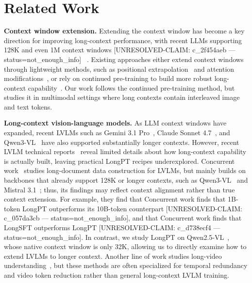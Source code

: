 \documentclass{llmxive}
\begin{document}
\section{Related Work}
\label{sec:related}
\noindent\textbf{Context window extension.}
Extending the context window has become a key direction for improving long-context performance, with recent LLMs supporting 128K and even 1M context windows [UNRESOLVED-CLAIM: c_2f454aeb — status=not_enough_info] ~\citep{yang2025qwen3,hurst2024gpt,team2024gemini_1_5,google2024gemini_2,google2025gemini2_5}.
Existing approaches either extend context windows through lightweight methods, such as positional extrapolation~\citep{chen2023extending,pengyarn,ding2024longrope,zhang2024extending,zhu2023pose} and attention modifications~\citep{chen2023longlora,xiao2023efficient,xiao2024infllm,bertsch2023unlimiformer,jin2024llm}, or rely on continued pre-training to build more robust long-context capability~\citep{xiong2024effective,fu2024data,gao2025prolong,Yang2025Qwen251MTR}.
Our work follows the continued pre-training method, but studies it in multimodal settings where long contexts contain interleaved image and text tokens.

\noindent\textbf{Long-context vision-language models.}
As LLM context windows have expanded, recent LVLMs such as Gemini 3.1 Pro~\citep{gemini_3_1_pro_2026}, Claude Sonnet 4.7~\citep{anthropic2026introducing_claude_opus_4_7}, and Qwen3-VL~\citep{bai2025qwen3} have also supported substantially longer contexts.
However, recent LVLM technical reports~\citep{bai2025qwen3,hong2025glm} reveal limited details about how long-context capability is actually built, leaving practical LongPT recipes underexplored.
Concurrent work~\citep{veselka2026longvlm} studies long-document data construction for LVLMs, but mainly builds on backbones that already support 128K or longer contexts, such as Qwen3-VL~\citep{bai2025qwen3} and Mistral 3.1~\citep{mistralai2025mistral_small_3_1}; thus, its findings may reflect context alignment rather than true context extension.
For example, they find that Concurrent work finds that 1B-token LongPT outperforms its 10B-token counterpart [UNRESOLVED-CLAIM: c_057da3cb — status=not_enough_info], and that Concurrent work finds that LongSFT outperforms LongPT [UNRESOLVED-CLAIM: c_d738ecf4 — status=not_enough_info].
In contrast, we study LongPT on Qwen2.5-VL~\citep{bai2025qwen2}, whose native context window is only 32K, allowing us to directly examine how to extend LVLMs to longer context.
Another line of work studies long-video understanding~\citep{chen2024longvila,shen2025longvita,yang2025eea,zhang2024longva,yang2025longvt,liu2025bolt,shen2024longvu}, but these methods are often specialized for temporal redundancy and video token reduction rather than general long-context LVLM training.
\end{document}
